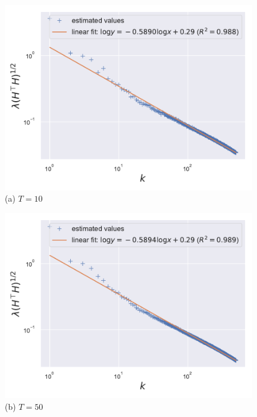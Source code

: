 \begin{figure}[thb]
\begin{center}
\begin{minipage}[t]{0.32\linewidth}
\centering
{\includegraphics[width=0.98\textwidth]{figs/privlm/roberta/npi_000010/eigenvalue-linfit.pdf}}
(a) $T=10$
\end{minipage}
\begin{minipage}[t]{0.32\linewidth}
\centering
{\includegraphics[width=0.98\textwidth]{figs/privlm/roberta/npi_000050/eigenvalue-linfit.pdf}}
(b) $T=50$
\end{minipage}
\begin{minipage}[t]{0.32\linewidth}
\centering

\end{minipage}
\end{center}
\end{figure}
